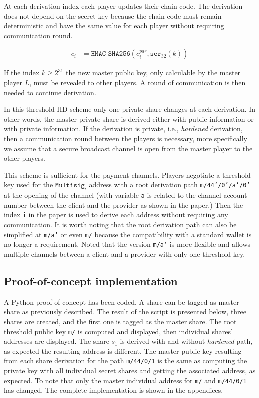 At each derivation index each player updates their chain code. The derivation
does not depend on the secret key because the chain code must remain
deterministic and have the same value for each player without requiring
communication round.

\begin{equation}
\begin{split}
  c_i &= \texttt{HMAC-SHA256}(c_i^{par}, \texttt{ser}_{32}(k))
\end{split}
\end{equation}

If the index $k \geq 2^{31}$ the new master public key, only calculable by the
master player $L$, must be revealed to other players. A round of communication
is then needed to continue derivation.

In this threshold HD scheme only one private share changes at each derivation. In
other words, the master private share is derived either with public information
or with private information. If the derivation is private, i.e.,
\textit{hardened} derivation, then a communication round between the players is
necessary, more specifically we assume that a secure broadcast channel is open
from the master player to the other players.

This scheme is sufficient for the payment channels. Players negotiate a
threshold key used for the $\texttt{Multisig}_i$ address with a root derivation
path \texttt{m/44'/0'/a'/0'} at the opening of the channel (with variable \texttt{a}
is related to the channel account number between the client and the provider as
shown in the paper.) Then the index \texttt{i} in the paper is used to derive
each address without requiring any communication. It is worth noting that the
root derivation path can also be simplified at \texttt{m/a'} or even \texttt{m/}
because the compatibility with a standard wallet is no longer a requirement.
Noted that the version \texttt{m/a'} is more flexible and allows multiple
channels between a client and a provider with only one threshold key.

\subsection{Proof-of-concept implementation}

A Python proof-of-concept has been coded. A share can be tagged as
master share as previously described. The result of the script is presented
below, three shares are created, and the first one is tagged as the master
share. The root threshold public key \texttt{m/} is computed and displayed, then
individual shares' addresses are displayed. The share $s_1$ is derived with and
without \textit{hardened} path, as expected the resulting address is different.
The master public key resulting from each share derivation for the path
\texttt{m/44/0/1} is the same as computing the private key with all individual
secret shares and getting the associated address, as expected. To note that only
the master individual address for \texttt{m/} and \texttt{m/44/0/1} has changed.
The complete implementation is shown in the appendices.

